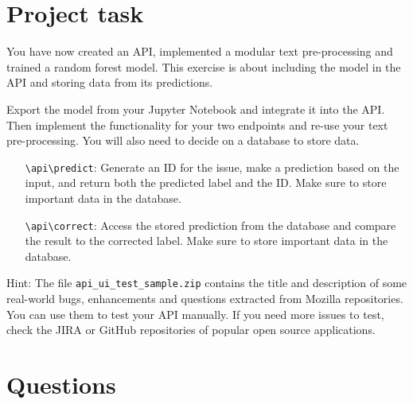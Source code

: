 

\newcommand{\dozenten}{Prof.~Dr.~Steffen Herbold}
\newcommand{\vorlesung}{Principles of AI Engineering}
\newcommand{\docauthor}{Lukas Schulte}
\newcommand{\semester}{}
\newcommand{\blattnummer}{5}
\newcommand{\bistermin}{}



\section*{Project task}

You have now created an API, implemented a modular text pre-processing and trained a random forest model. This exercise is about including the model in the API and storing data from its predictions.

\vspace{5px}

Export the model from your Jupyter Notebook and integrate it into the API. Then implement the functionality for your two endpoints and re-use your text pre-processing. You will also need to decide on a database to store data.

\begin{itemize}[align=left]
      \item[\texttt{\textbackslash{}api\textbackslash{}predict}:] Generate an ID for the issue, make a prediction based on the input, and return both the predicted label and the ID. Make sure to store important data in the database.
      \item[\texttt{\textbackslash{}api\textbackslash{}correct}:] Access the stored prediction from the database and compare the result to the corrected label. Make sure to store important data in the database.
\end{itemize}

\vspace{5px}

Hint:
The file \texttt{api\_ui\_test\_sample.zip} contains the title and description of some real-world bugs, enhancements and questions extracted from Mozilla repositories. You can use them to test your API manually. If you need more issues to test, check the JIRA or GitHub repositories of popular open source applications.

\section*{Questions}


